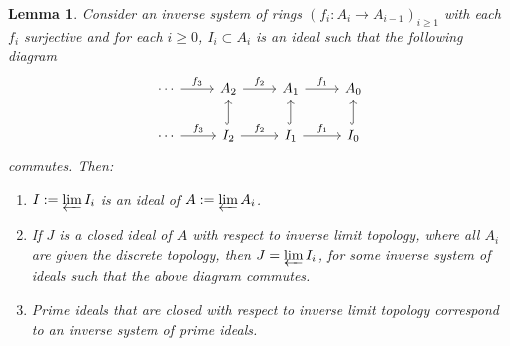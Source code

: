 \documentclass[12pts,a4paper]{amsart}
\newtheorem{lemma}[proposition]{Lemma}
\begin{document}
\begin{lemma}\label{lemma2.3}
	Consider an inverse system of rings $(f_i:A_i\to A_{i-1})_{i\geq 1}$ with each $f_i$ surjective and for each $i\geq 0$, $I_i\subset A_i$ is an ideal such that the following diagram
	\[
	\begin{tikzcd}
	\cdots \arrow[r,"f_3"] & A_2\arrow[r,"f_2"]                          & A_1\arrow[r,"f_1"]                           & A_0\\
	\cdots\arrow[r,"f_3"]  & I_2\arrow[r,"f_2"] \arrow[u,hook] & I_1\arrow[r,"f_1"]   \arrow[u,hook] & I_0\arrow[u,hook]
	\end{tikzcd}
	\]
	commutes. Then:
	\begin{enumerate}
		\item[(i).] $I:=\varprojlim\limits I_i$ is an ideal of $A:=\varprojlim A_i$.
		\item[(ii).] If $J$ is a closed ideal of $A$ with respect to inverse limit topology, where all $A_i$ are given the discrete topology, then $J=\varprojlim I_i$, for some inverse system of ideals such that the above diagram commutes.
		\item[(iii).] Prime ideals that are closed with respect to inverse limit topology correspond to an inverse system of prime ideals.
	\end{enumerate}
\end{lemma}
\end{document}
